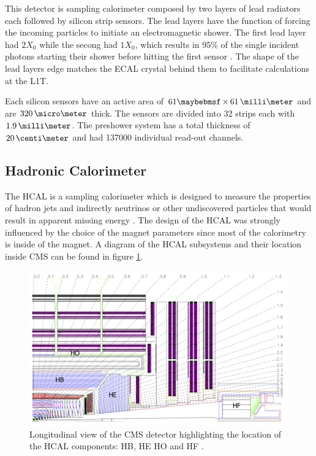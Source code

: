 This detector is sampling calorimeter composed by two layers of lead radiators each followed by silicon strip sensors. The lead layers have the function of forcing the incoming particles to initiate an electromagnetic shower. The first lead layer had $2X_0$ while the secong had $1X_0$, which results in 95\% of the single incident photons starting their shower before hitting the first sensor \cite{ARTICLE:TheCMSExperiment}. The shape of the lead layers edge matches the \gls{ECAL} crystal behind them to facilitate calculations at the \gls{L1T}.

Each silicon sensors have an active area of $61 \times 61\,\milli\meter$ and are $320\,\micro\meter$ thick. The sensors are divided into 32 strips each with $1.9\,\milli\meter$.  The preshower system has a total thickness of $20\,\centi\meter$ and had 137000 individual read-out channels. 

\subsection{Hadronic Calorimeter}
\label{SUBSECTION:ExperimentalApparatus_CMS_HCAL}


The \acrfull{HCAL} is a sampling calorimeter which is designed to measure the properties of hadron jets and indirectly neutrinos or other undiscovered particles that would result in apparent missing energy \cite{CMSTDR:CMSHCAL}. The design of the \gls{HCAL} was strongly influenced by the choice of the magnet parameters since most of the calorimetry is inside of the magnet. A diagram of the \gls{HCAL} subsystems and their location inside \gls{CMS} can be found in figure \ref{FIGURE:ExperimentalApparatus_CMS_HCAL_Layout}.

\begin{figure}[!htb]
  \centering
  \includegraphics[width=1.0\textwidth]{Chapter02/CMS/Images/CMS_HCAL_Layout.png}
  \caption{Longitudinal view of the CMS detector highlighting the location of the \gls{HCAL} components: \gls{HB}, \gls{HE} \gls{HO} and \gls{HF} \cite{ARTICLE:TheCMSExperiment}.}
  \label{FIGURE:ExperimentalApparatus_CMS_HCAL_Layout}
\end{figure}

